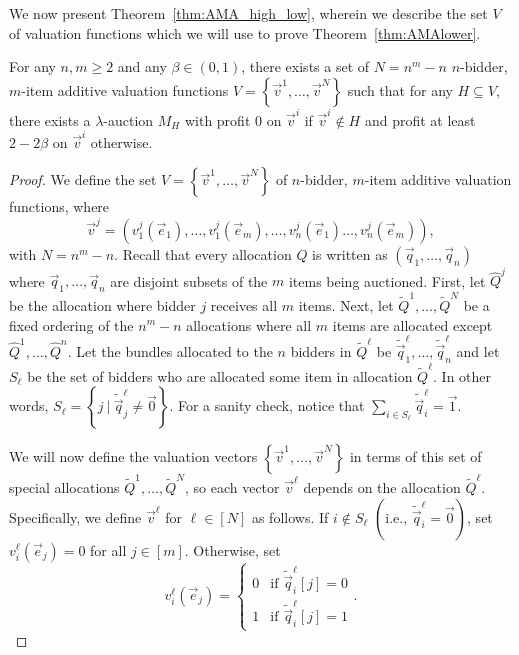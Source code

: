 We now present Theorem~\ref{thm:AMA_high_low}, wherein we describe the set $V$ of valuation functions which we will use to prove Theorem~\ref{thm:AMAlower}.

\begin{theorem}\label{thm:AMA_high_low}
For any $n,m \geq 2$ and any $\beta \in (0,1)$, there exists a set of $N = n^m-n$ $n$-bidder, $m$-item additive valuation functions $V = \left\{\vec{v}^1, \dots, \vec{v}^N\right\}$ such that for any $H \subseteq V$, there exists a $\lambda$-auction $M_H$ with profit 0 on $\vec{v}^i$ if $\vec{v}^i \not\in H$ and profit at least $2-2\beta$ on $\vec{v}^i$ otherwise.
\end{theorem}

\begin{proof}
We define the set $V = \left\{\vec{v}^1, \dots, \vec{v}^N\right\}$ of $n$-bidder, $m$-item additive valuation functions, where \[\vec{v}^j = \left(v_1^j(\vec{e}_1), \dots, v_1^j(\vec{e}_m), \dots, v_n^j(\vec{e}_1) \dots, v_n^j(\vec{e}_m)\right),\] with $N = n^m - n$. Recall that every allocation $Q$ is written as $\left(\vec{q}_1,\dots,  \vec{q}_n\right)$ where $\vec{q}_1,\dots,  \vec{q}_n$ are disjoint subsets of the $m$ items being auctioned. First, let $\hat{Q}^j$ be the allocation where bidder $j$ receives all $m$ items. Next, let $\tilde{Q}^1, \dots, \tilde{Q}^N$ be a fixed ordering of the $n^m-n$ allocations where all $m$ items are allocated except $\hat{Q}^1, \dots, \hat{Q}^n$. Let the bundles allocated to the $n$ bidders in $\tilde{Q}^\ell$ be $\tilde{\vec{q}}^{\ell}_1, \dots, \tilde{\vec{q}}^{\ell}_n$ and let $S_\ell$ be the set of bidders who are allocated some item in allocation $\tilde{Q}^{\ell}$. In other words, $S_{\ell} = \left\{j \ | \ \tilde{\vec{q}}^{\ell}_j \not=\vec{0}\right\}$. For a sanity check, notice that $\sum_{i \in S_{\ell}} \tilde{\vec{q}}^{\ell}_i = \vec{1}$.

We will now define the valuation vectors $\left\{\vec{v}^1, \dots, \vec{v}^N\right\}$ in terms of this set of special allocations $\tilde{Q}^1, \dots, \tilde{Q}^N$, so each vector $\vec{v}^{\ell}$ depends on the allocation $\tilde{Q}^{\ell}$. Specifically, we define $\vec{v}^\ell$ for $\ell \in [N]$ as follows.
If $i \not\in S_\ell$ $\left( \text{i.e., }\tilde{\vec{q}}^\ell_i = \vec{0}\right)$, set $v_i^\ell(\vec{e}_j) = 0$ for all $j \in [m]$. Otherwise, set \[v_i^\ell(\vec{e}_j) = \begin{cases} 0 &\text{if } \tilde{\vec{q}}^\ell_i[j] = 0\\
1 &\text{if } \tilde{\vec{q}}^\ell_i[j] = 1
\end{cases}.\]


\end{proof}
